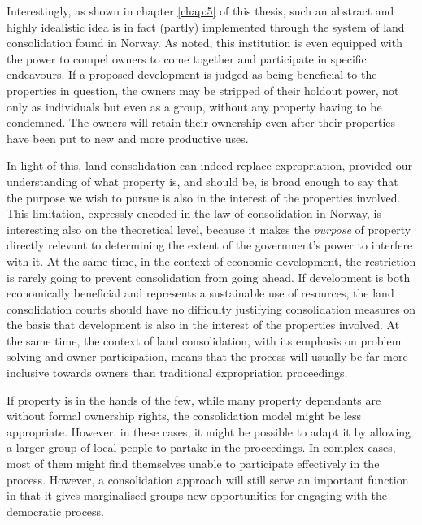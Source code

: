 {Interestingly, as shown in chapter \ref{chap:5} of this thesis, such an abstract and highly idealistic idea is in fact (partly) implemented through the system of land consolidation found in Norway. As noted, this institution is even equipped with the power to compel owners to come together and participate in specific endeavours. If a proposed development is judged as being beneficial to the properties in question, the owners may be stripped of their holdout power, not only as individuals but even as a group, without any property having to be condemned. The owners will retain their ownership even after their properties have been put to new and more productive uses.

In light of this, land consolidation can indeed replace expropriation, provided our understanding of what property is, and should be, is broad enough to say that the purpose we wish to pursue is also in the interest of the properties involved. This limitation, expressly encoded in the law of consolidation in Norway, is interesting also on the theoretical level, because it makes the {\it purpose} of property directly relevant to determining the extent of the government's power to interfere with it. At the same time,  in the context of economic development, the restriction is rarely going to prevent consolidation from going ahead. If development is both economically beneficial and represents a sustainable use of resources, the land consolidation courts should have no difficulty justifying consolidation measures on the basis that development is also in the interest of the properties involved. At the same time, the context of land consolidation, with its emphasis on problem solving and owner participation, means that the process will usually be far more inclusive towards owners than traditional expropriation proceedings. 

If property is in the hands of the few, while many property dependants are without formal ownership rights, the consolidation model might be less appropriate. However, in these cases, it might be possible to adapt it by allowing a larger group of local people to partake in the proceedings. In complex cases, most of them might find themselves unable to participate effectively in the process. However, a consolidation approach will still serve an important function in that it gives marginalised groups new opportunities for engaging with the democratic process.


}
